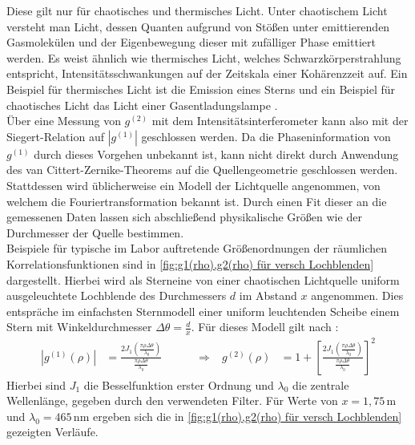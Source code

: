 Diese gilt nur für chaotisches und thermisches Licht. 
Unter chaotischem Licht versteht man Licht, dessen Quanten aufgrund von Stößen unter emittierenden Gasmolekülen und der Eigenbewegung dieser mit zufälliger Phase emittiert werden. 
Es weist ähnlich wie thermisches Licht, welches Schwarzkörperstrahlung entspricht, Intensitätsschwankungen auf der Zeitskala einer Kohärenzzeit auf. 
Ein Beispiel für thermisches Licht ist die Emission eines Sterns und ein Beispiel für chaotisches Licht das Licht einer Gasentladungslampe \cite{foxQuantumOpticsIntroduction2006}. \\
Über eine Messung von $g^{(2)}$ mit dem Intensitätsinterferometer kann also mit der Siegert-Relation auf $\left|g^{(1)}\right|$ geschlossen werden. 
Da die Phaseninformation von $g^{(1)}$ durch dieses Vorgehen unbekannt ist, kann nicht direkt durch Anwendung des van Cittert-Zernike-Theorems auf die Quellengeometrie geschlossen werden. 
Stattdessen wird üblicherweise ein Modell der Lichtquelle angenommen, von welchem die Fouriertransformation bekannt ist. 
Durch einen Fit dieser an die gemessenen Daten lassen sich abschließend physikalische Größen wie der Durchmesser der Quelle bestimmen. \\
Beispiele für typische im Labor auftretende Größenordnungen der räumlichen Korrelationsfunktionen sind in \autoref{fig:g1(rho),g2(rho) für versch Lochblenden} dargestellt. 
Hierbei wird als \glqq Stern\grqq\;eine von einer chaotischen Lichtquelle uniform ausgeleuchtete Lochblende des Durchmessers $d$ im Abstand $x$ angenommen. 
Dies entspräche im einfachsten Sternmodell einer uniform leuchtenden Scheibe einem Stern mit Winkeldurchmesser $\Delta \theta = \frac{d}{x}$. 
Für dieses Modell gilt nach \cite[Kap. 4.1]{brownIntensityInterferometerIts1974}:
\begin{align}
    \left| g^{(1)}(\rho)\right| &= \frac{2J_1\left(\frac{\pi\rho\Delta\theta}{\lambda_0}\right)}{\frac{\pi\rho\Delta\theta}{\lambda_0}}\quad\quad\quad \Rightarrow & g^{(2)}(\rho) &= 1 + \left[\frac{2J_1\left(\frac{\pi\rho\Delta\theta}{\lambda_0}\right)}{\frac{\pi\rho\Delta\theta}{\lambda_0}}\right]^2
\end{align}
Hierbei sind $J_1$ die Besselfunktion erster Ordnung und $\lambda_0$ die zentrale Wellenlänge, gegeben durch den verwendeten Filter. 
Für Werte von $x=1{,}75\,\mathrm{m}$ und $\lambda_0=465\,\mathrm{nm}$ ergeben sich die in \autoref{fig:g1(rho),g2(rho) für versch Lochblenden} gezeigten Verläufe. 
